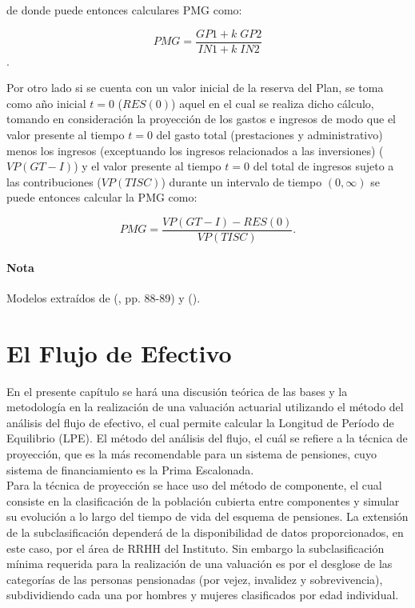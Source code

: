 \documentclass[12pt,letterpaper,titlepage]{article}
\begin{document}
{de donde puede entonces calculares PMG como:
\begin{center}
	\[ PMG=\dfrac{GP1+k\;GP2}{IN1+k\;IN2} \].
\end{center}

Por otro lado si se cuenta con un valor inicial de la reserva del Plan, se toma como año inicial $t=0$ ($RES(0)$) aquel en el cual se realiza dicho cálculo, tomando en consideración la proyección de los gastos e ingresos de modo que el valor presente al tiempo $t=0$ del gasto total (prestaciones y administrativo) menos los ingresos (exceptuando los ingresos relacionados a las inversiones) ($V\!P(GT-I)$) y el valor presente al tiempo $t=0$ del total de ingresos sujeto a las contribuciones ($V\!P(TISC)$) durante un intervalo de tiempo $(0, \infty)$ se puede entonces calcular la PMG como:

	\[ PMG=\dfrac{V\!P(GT-I)-RES(0)}{V\!P(TISC)}. \]
	
\paragraph{Nota}Modelos extraídos de  (\cite{amssp}, pp. 88-89) y (\cite{fsp}).



\newpage
\section{El Flujo de Efectivo}

En el presente capítulo se hará una discusión teórica de las bases y la metodología en la realización de una valuación actuarial utilizando el método del análisis del flujo de efectivo, el cual permite calcular la Longitud de Período de Equilibrio (LPE). El método del análisis del flujo, el cuál se refiere a la técnica de proyección, que es la más recomendable para un sistema de pensiones, cuyo sistema de financiamiento es la Prima Escalonada.\\

Para la técnica de proyección se hace uso del método de componente, el cual consiste en la clasificación de la población cubierta entre componentes y simular su evolución a lo largo del tiempo de vida del esquema de pensiones. La extensión de la subclasificación dependerá de la disponibilidad de datos proporcionados, en este caso, por el área de RRHH del Instituto. Sin embargo la subclasificación mínima requerida para la realización de una valuación es por el desglose de las categorías de las personas pensionadas (por vejez, invalidez y sobrevivencia), subdividiendo cada una por hombres y mujeres clasificados por edad individual.

}
\end{document}
